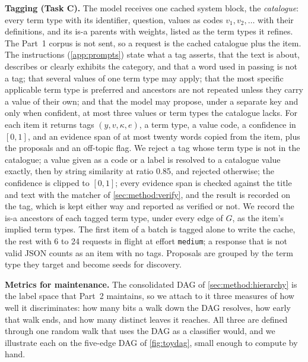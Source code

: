 \textbf{Tagging (Task C).} The model receives one cached system block, the
\emph{catalogue}: every term type with its identifier, question, values as
codes $v_1, v_2, \dots$ with their definitions, and its is-a parents with weights,
listed as the term types it refines. The Part~1 corpus is not sent, so a
request is the cached catalogue plus the item. The instructions
(\cref{app:prompts}) state what a tag asserts, that the text is about,
describes or clearly exhibits the category, and that a word used in passing
is not a tag; that several values of one term type may apply; that the most
specific applicable term type is preferred and ancestors are not repeated
unless they carry a value of their own; and that the model may propose, under
a separate key and only when confident, at most three values or term types the
catalogue lacks. For each item it returns tags $(y, v, \kappa, e)$, a term type, a value code, a confidence in $[0,1]$, and an evidence span of at most twenty
words copied from the item, plus the proposals and an off-topic flag. We
reject a tag whose term type is not in the catalogue; a value given as a code
or a label is resolved to a catalogue value exactly, then by string similarity
at ratio 0.85, and rejected otherwise; the confidence is clipped to $[0,1]$;
every evidence span is checked against the title and text with the matcher of
\cref{sec:method:verify}, and the result is recorded on the tag, which is kept
either way and reported as verified or not. We record the is-a ancestors of
each tagged term type, under every edge of $G$, as the item's implied term
types. The first item of a batch is tagged alone to write the cache, the rest
with 6 to 24 requests in flight at effort \texttt{medium}; a response that is
not valid JSON counts as an item with no tags. Proposals are grouped by the
term type they target and become seeds for discovery.

\textbf{Metrics for maintenance.} The consolidated DAG of
\cref{sec:method:hierarchy} is the label space that Part~2 maintains, so we
attach to it three measures of how well it discriminates: how many bits a walk down the DAG resolves, how early that walk
ends, and how many distinct leaves it reaches. All three are defined through
one random walk that uses the DAG as a classifier would, and we illustrate
each on the five-edge DAG of \cref{fig:toydag}, small enough to compute by
hand.

